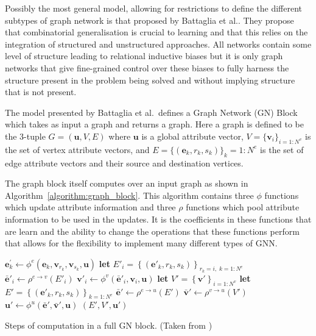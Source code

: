 Possibly the most general model, allowing for restrictions to define the different subtypes of graph network is that proposed by Battaglia et al.\cite{battaglia2018relational}. They propose that combinatorial generalisation is crucial to learning and that this relies on the integration of structured and unstructured approaches. All networks contain some level of structure leading to relational inductive biases but it is only graph networks that give fine-grained control over these biases to fully harness the structure present in the problem being solved and without implying structure that is not present.

The model presented by Battaglia et al.\ defines a Graph Network (GN) Block which takes as input a graph and returns a graph. Here a graph is defined to be the 3-tuple $G = (\bm{u}, V, E)$ where $\bm{u}$ is a global attribute vector, $V = \{\bm{v}_i\}_{i=1:N^v}$ is the set of vertex attribute vectors, and $E = \{(\bm{e}_k, r_k, s_k)\}_k=1:N^e$ is the set of edge attribute vectors and their source and destination vertices.

The graph block itself computes over an input graph as shown in Algorithm~\ref{algorithm:graph_block}. This algorithm contains three $\phi$ functions which update attribute information and three $\rho$ functions which pool attribute information to be used in the updates. It is the coefficients in these functions that are learn and the ability to change the operations that these functions perform that allows for the flexibility to implement many different types of GNN.

\begin{algorithm}[t]
\small
\begin{algorithmic}
        \State $\mathbf{e}_k^\prime\gets \phi^e\left(\mathbf{e}_k, \mathbf{v}_{r_k}, \mathbf{v}_{s_k}, \mathbf{u} \right)$
    \EndFor
        \State \textbf{let} $E'_i = \left\{\left(\mathbf{e}'_k, r_k, s_k \right)\right\}_{r_k=i,\; k=1:N^e}$
        \State $\mathbf{\bar{e}}'_i \gets \rho^{e \rightarrow v}\left(E'_i\right)$
        \State $\mathbf{v}'_i \gets \phi^v\left(\mathbf{\bar{e}}'_i, \mathbf{v}_i, \mathbf{u}\right)$
    \EndFor
    \State \textbf{let} $V' = \left\{\mathbf{v}'\right\}_{i=1:N^v}$
    \State \textbf{let} $E' = \left\{\left(\mathbf{e}'_k, r_k, s_k \right)\right\}_{k=1:N^e}$
    \State $\mathbf{\bar{e}}' \gets \rho^{e \rightarrow u}\left(E'\right)$
    \State $\mathbf{\bar{v}}' \gets \rho^{v \rightarrow u}\left(V'\right)$
    \State $\mathbf{u}' \gets \phi^u\left(\mathbf{\bar{e}}', \mathbf{\bar{v}}', \mathbf{u}\right)$
    \State \Return $(E', V', \mathbf{u}')$
\EndFunction
\end{algorithmic}
\caption{Steps of computation in a full GN block. (Taken from \cite{battaglia2018relational})}
\label{algorithm:graph_block}
\end{algorithm}


